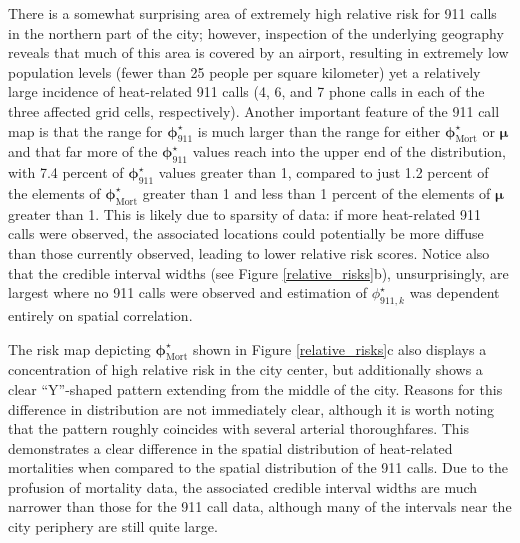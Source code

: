 \documentclass[final]{statsoc}
\begin{document}
There is a somewhat surprising area of extremely high relative risk for 911 calls in the northern part of the city; however, inspection of the underlying geography reveals that much of this area is covered by an airport, resulting in extremely low population levels (fewer than 25 people per square kilometer) yet a relatively large incidence of heat-related 911 calls (4, 6, and 7 phone calls in each of the three affected grid cells, respectively). Another important feature of the 911 call map is that the range for $\boldsymbol\phi^\star_{911}$ is much larger than the range for either $\boldsymbol\phi^\star_{\text{Mort}}$ or $\boldsymbol\mu$ and that far more of the $\boldsymbol\phi^\star_{911}$ values reach into the upper end of the distribution, with 7.4 percent of $\boldsymbol\phi^\star_{911}$ values greater than 1, compared to just 1.2 percent of the elements of $\boldsymbol\phi^\star_{\text{Mort}}$ greater than 1 and less than 1 percent of the elements of $\boldsymbol\mu$ greater than 1. This is likely due to sparsity of data: if more heat-related 911 calls were observed, the associated locations could potentially be more diffuse than those currently observed, leading to lower relative risk scores. Notice also that the credible interval widths (see Figure \ref{relative_risks}b), unsurprisingly, are largest where no 911 calls were observed and estimation of $\phi^\star_{911,k}$ was dependent entirely on spatial correlation. 

The risk map depicting $\boldsymbol\phi^\star_{\text{Mort}}$ shown in Figure \ref{relative_risks}c also displays a concentration of high relative risk in the city center, but additionally shows a clear ``Y''-shaped pattern extending from the middle of the city. Reasons for this difference in distribution are not immediately clear, although it is worth noting that the pattern roughly coincides with several arterial thoroughfares. This demonstrates a clear difference in the spatial distribution of heat-related mortalities when compared to the spatial distribution of the 911 calls. Due to the profusion of mortality data, the associated credible interval widths are much narrower than those for the 911 call data, although many of the intervals near the city periphery are still quite large.
\end{document}

